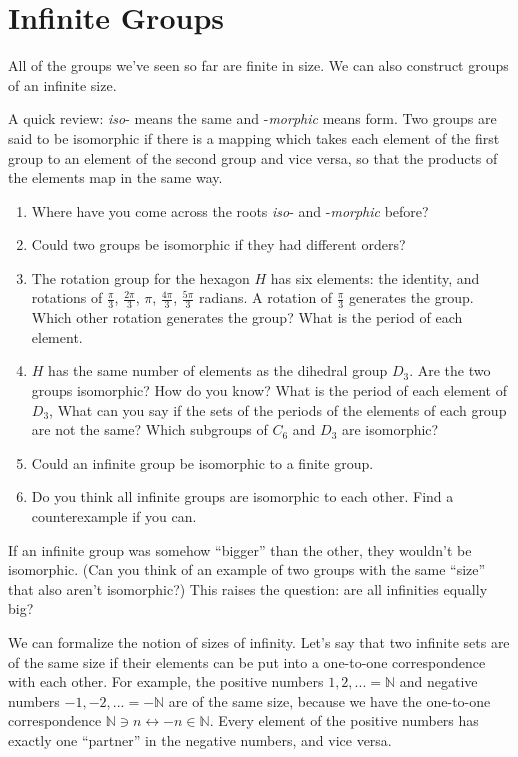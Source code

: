 \documentclass[../gatm.tex]{subfiles}
\begin{document}
\section{Infinite Groups}


All of the groups we've seen so far are finite in size. We can also construct groups of an infinite size.

A quick review: \textit{iso}- means the same and -\textit{morphic} means form. Two groups are said to be isomorphic if there is a mapping which takes each element of the first group to an element of the second group and vice versa, so that the products of the elements map in the same way.

\begin{enumerate}
\item Where have you come across the roots \textit{iso}- and -\textit{morphic} before?
\item Could two groups be isomorphic if they had different orders?
\item The rotation group for the hexagon $H$ has six elements: the identity, and rotations of $\frac{\pi}{3}$, $\frac{2\pi}{3}$, $\pi$, $\frac{4\pi}{3}$, $\frac{5\pi}{3}$ radians. A rotation of $\frac{\pi}{3}$ generates the group. Which other rotation generates the group? What is the period of each element.
\item $H$ has the same number of elements as the dihedral group $D_3$. Are the two groups isomorphic? How do you know? What is the period of each element of $D_3$, What can you say if the sets of the periods of the elements of each group are not the same? Which subgroups of $C_6$ and $D_3$ are isomorphic?
\item Could an infinite group be isomorphic to a finite group.
\item Do you think all infinite groups are isomorphic to each other. Find a counterexample if you can.
\setcounter{inf_problem_i}{\value{enumi}}
\end{enumerate}

If an infinite group was somehow ``bigger'' than the other, they wouldn't be isomorphic. (Can you think of an example of two groups with the same ``size'' that also aren't isomorphic?) This raises the question: are all infinities equally big?

We can formalize the notion of sizes of infinity. Let's say that two infinite sets are of the same size if their elements can be put into a one-to-one correspondence with each other. For example, the positive numbers ${1,2,...}=\mathbb{N}$ and negative numbers ${-1,-2,...}=-\mathbb{N}$ are of the same size, because we have the one-to-one correspondence $\mathbb{N} \ni n\leftrightarrow -n \in \mathbb{N}$. Every element of the positive numbers has exactly one ``partner'' in the negative numbers, and vice versa.
\end{document}
